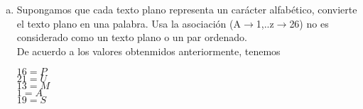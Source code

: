 \documentclass[12pt, letterpaper]{article}
\begin{document}
\begin{enumerate}[a)]
\item Supongamos que cada texto plano representa un carácter alfabético, convierte el
texto plano en una palabra. Usa la asociación (A$\rightarrow$1,..z$\rightarrow$26)
no es considerado como un texto plano o un par ordenado.
\\
De acuerdo a los valores obtenmidos anteriormente, tenemos
\begin{center}
$16=P$
\\
$21=U$
\\
$13=M$
\\
$1=A$
\\
$19=S$
\end{center}

\end{enumerate}
\end{document}
